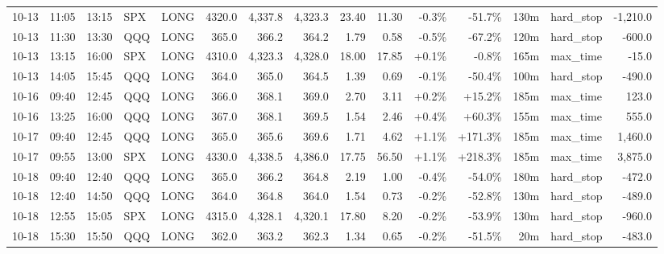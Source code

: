 \documentclass[11pt,a4paper,twoside]{article}
\begin{document}
\begin{landscape}
\begin{center}
\begin{longtable}{>{\color{txtmain}}l l l l l r r r r r r r r >{\color{txtmain}}l r}
10-13 & 11:05 & 13:15 & SPX & LONG & 4320.0 & 4,337.8 & 4,323.3 & 23.40 & 11.30 & \textcolor{lossred}{-0.3\%} & \textcolor{lossred}{-51.7\%} & 130m & hard\_stop & \textcolor{lossred}{-1,210.0} \\
10-13 & 11:30 & 13:30 & QQQ & LONG & 365.0 & 366.2 & 364.2 & 1.79 & 0.58 & \textcolor{lossred}{-0.5\%} & \textcolor{lossred}{-67.2\%} & 120m & hard\_stop & \textcolor{lossred}{-600.0} \\
10-13 & 13:15 & 16:00 & SPX & LONG & 4310.0 & 4,323.3 & 4,328.0 & 18.00 & 17.85 & \textcolor{wingreen}{+0.1\%} & \textcolor{lossred}{-0.8\%} & 165m & max\_time & \textcolor{lossred}{-15.0} \\
10-13 & 14:05 & 15:45 & QQQ & LONG & 364.0 & 365.0 & 364.5 & 1.39 & 0.69 & \textcolor{lossred}{-0.1\%} & \textcolor{lossred}{-50.4\%} & 100m & hard\_stop & \textcolor{lossred}{-490.0} \\
10-16 & 09:40 & 12:45 & QQQ & LONG & 366.0 & 368.1 & 369.0 & 2.70 & 3.11 & \textcolor{wingreen}{+0.2\%} & \textcolor{wingreen}{+15.2\%} & 185m & max\_time & \textcolor{wingreen}{123.0} \\
10-16 & 13:25 & 16:00 & QQQ & LONG & 367.0 & 368.1 & 369.5 & 1.54 & 2.46 & \textcolor{wingreen}{+0.4\%} & \textcolor{wingreen}{+60.3\%} & 155m & max\_time & \textcolor{wingreen}{555.0} \\
10-17 & 09:40 & 12:45 & QQQ & LONG & 365.0 & 365.6 & 369.6 & 1.71 & 4.62 & \textcolor{wingreen}{+1.1\%} & \textcolor{wingreen}{+171.3\%} & 185m & max\_time & \textcolor{wingreen}{1,460.0} \\
10-17 & 09:55 & 13:00 & SPX & LONG & 4330.0 & 4,338.5 & 4,386.0 & 17.75 & 56.50 & \textcolor{wingreen}{+1.1\%} & \textcolor{wingreen}{+218.3\%} & 185m & max\_time & \textcolor{wingreen}{3,875.0} \\
10-18 & 09:40 & 12:40 & QQQ & LONG & 365.0 & 366.2 & 364.8 & 2.19 & 1.00 & \textcolor{lossred}{-0.4\%} & \textcolor{lossred}{-54.0\%} & 180m & hard\_stop & \textcolor{lossred}{-472.0} \\
10-18 & 12:40 & 14:50 & QQQ & LONG & 364.0 & 364.8 & 364.0 & 1.54 & 0.73 & \textcolor{lossred}{-0.2\%} & \textcolor{lossred}{-52.8\%} & 130m & hard\_stop & \textcolor{lossred}{-489.0} \\
10-18 & 12:55 & 15:05 & SPX & LONG & 4315.0 & 4,328.1 & 4,320.1 & 17.80 & 8.20 & \textcolor{lossred}{-0.2\%} & \textcolor{lossred}{-53.9\%} & 130m & hard\_stop & \textcolor{lossred}{-960.0} \\
10-18 & 15:30 & 15:50 & QQQ & LONG & 362.0 & 363.2 & 362.3 & 1.34 & 0.65 & \textcolor{lossred}{-0.2\%} & \textcolor{lossred}{-51.5\%} & 20m & hard\_stop & \textcolor{lossred}{-483.0} \\

\end{longtable}
\end{center}
\end{landscape}
\end{document}

